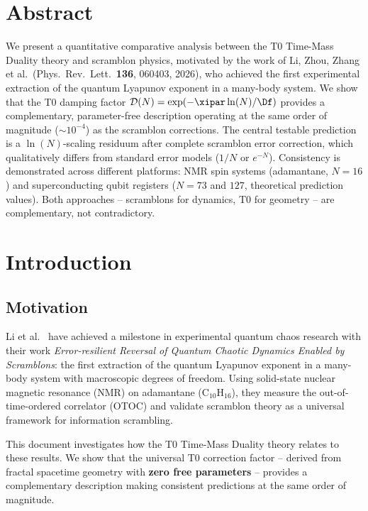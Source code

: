 \section*{Abstract}
We present a quantitative comparative analysis between the T0 Time-Mass Duality theory and scramblon physics, motivated by the work of Li, Zhou, Zhang et al.\ (Phys.\ Rev.\ Lett.\ \textbf{136}, 060403, 2026), who achieved the first experimental extraction of the quantum Lyapunov exponent in a many-body system. We show that the T0 damping factor $\mathcal{D}(N) = \exp(-\xipar \ln(N)/\Df)$ provides a complementary, parameter-free description operating at the same order of magnitude ($\sim 10^{-4}$) as the scramblon corrections. The central testable prediction is a $\ln(N)$-scaling residuum after complete scramblon error correction, which qualitatively differs from standard error models ($1/N$ or $e^{-N}$). Consistency is demonstrated across different platforms: NMR spin systems (adamantane, $N=16$) and superconducting qubit registers ($N = 73$ and $127$, theoretical prediction values). Both approaches -- scramblons for dynamics, T0 for geometry -- are complementary, not contradictory.

\clearpage

\section{Introduction}
\label{sec:intro}

\subsection{Motivation}

Li et al.\ \cite{li_scramblons_2026} have achieved a milestone in experimental quantum chaos research with their work \emph{Error-resilient Reversal of Quantum Chaotic Dynamics Enabled by Scramblons}: the first extraction of the quantum Lyapunov exponent in a many-body system with macroscopic degrees of freedom. Using solid-state nuclear magnetic resonance (NMR) on adamantane (C$_{10}$H$_{16}$), they measure the out-of-time-ordered correlator (OTOC) and validate scramblon theory as a universal framework for information scrambling.

This document investigates how the T0 Time-Mass Duality theory \cite{pascher_t0_2025} relates to these results. We show that the universal T0 correction factor -- derived from fractal spacetime geometry with \textbf{zero free parameters} -- provides a complementary description making consistent predictions at the same order of magnitude.

